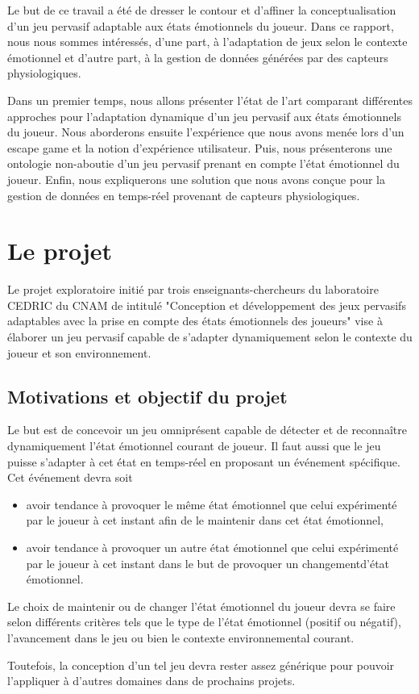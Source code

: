 \documentclass{article}
\begin{document}
	Le but de ce travail a été de dresser le contour et d'affiner la conceptualisation d'un jeu pervasif adaptable aux états émotionnels du joueur. 
	Dans ce rapport, nous nous sommes intéressés, d'une part, à l'adaptation de jeux selon le contexte émotionnel et d'autre part, à la gestion de données générées par des capteurs physiologiques.\par
	Dans un premier temps, nous allons présenter l'état de l'art comparant différentes approches pour l'adaptation dynamique d'un jeu pervasif aux états émotionnels du joueur. 
	Nous aborderons ensuite l'expérience que nous avons menée lors d'un escape game et la notion d'expérience utilisateur.
	Puis, nous présenterons une ontologie non-aboutie d'un jeu pervasif prenant en compte l'état émotionnel du joueur.
	Enfin, nous expliquerons une solution que nous avons conçue pour la gestion de données en temps-réel provenant de capteurs physiologiques.

\section{Le projet}
	Le projet exploratoire initié par trois enseignants-chercheurs du laboratoire CEDRIC du CNAM de intitulé "Conception et développement des jeux pervasifs adaptables avec la prise en compte des états émotionnels des joueurs" vise à élaborer un jeu pervasif capable de s'adapter dynamiquement selon le contexte du joueur et son environnement.
	\subsection{Motivations et objectif du projet}
		Le but est de concevoir un jeu omniprésent capable de détecter et de reconnaître dynamiquement l'état émotionnel courant de joueur. 
		Il faut aussi que le jeu puisse s'adapter à cet état en temps-réel en proposant un événement spécifique. 
		Cet événement devra soit 
		\begin{itemize}
			\item avoir tendance à provoquer le même état émotionnel que celui expérimenté par le joueur à cet instant afin de le maintenir dans cet état émotionnel,
			\item avoir tendance à provoquer un autre état émotionnel que celui expérimenté par le joueur à cet instant dans le but de provoquer un changementd'état émotionnel.
		\end{itemize}
		Le choix de maintenir ou de changer l'état émotionnel du joueur devra se faire selon différents critères tels que le type de l'état émotionnel (positif ou négatif), l'avancement dans le jeu ou bien le contexte environnemental courant.\par
		Toutefois, la conception d'un tel jeu devra rester assez générique pour pouvoir l'appliquer à d'autres domaines dans de prochains projets.
\end{document}
